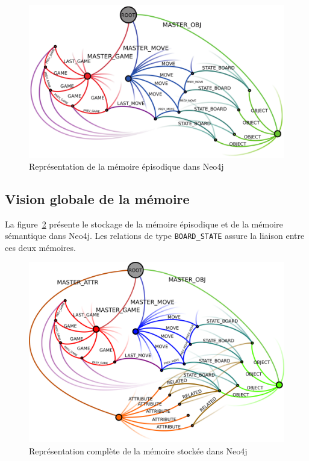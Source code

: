 \begin{figure}[H]
\includegraphics[width=\textwidth]{files/neo4j/episodic_graph}
\caption{Représentation de la mémoire épisodique dans Neo4j}
\label{episodic_graph}
\end{figure}

\subsection{Vision globale de la mémoire}

La figure~\ref{full_graph} présente le stockage de la mémoire épisodique et de la mémoire sémantique dans Neo4j. Les relations de type \texttt{BOARD\_STATE} assure la liaison entre ces deux mémoires.
\begin{figure}[H]
\includegraphics[width=\textwidth]{files/neo4j/full_graph}
\caption{Représentation complète de la mémoire stockée dans Neo4j}
\label{full_graph}
\end{figure}